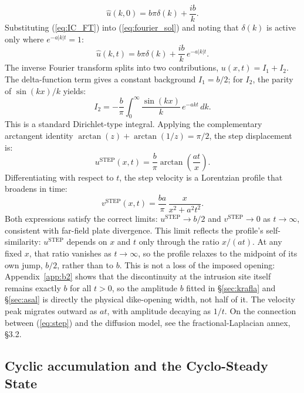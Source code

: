 \documentclass[extra]{gji}
\begin{document}
\begin{equation}
\hat{u}(k,0) = b\pi\delta(k) + \frac{ib}{k}.
\label{eq:IC_FT}
\end{equation}
Substituting (\ref{eq:IC_FT}) into (\ref{eq:fourier_sol}) and noting that
$\delta(k)$ is active only where $e^{-a|k|t}=1$:
\begin{equation}
\hat{u}(k,t) = b\pi\delta(k) + \frac{ib}{k}\,e^{-a|k|t}.
\label{eq:evolved}
\end{equation}
The inverse Fourier transform splits into two contributions,
$u(x,t) = I_1 + I_2$. The delta-function term gives a constant background
$I_1 = b/2$; for $I_2$, the parity of $\sin(kx)/k$ yields:
\begin{equation}
I_2 = -\frac{b}{\pi}\int_0^{\infty}\frac{\sin(kx)}{k}\,e^{-akt}\,dk.
\label{eq:I2}
\end{equation}
This is a standard Dirichlet-type integral. Applying the complementary
arctangent identity $\arctan(z)+\arctan(1/z)=\pi/2$, the step displacement is:
\begin{equation}
\boxed{u^{\text{STEP}}(x,t) = \frac{b}{\pi}\arctan\!\left(\frac{at}{x}\right).}
\label{eq:step}
\end{equation}
Differentiating with respect to $t$, the step velocity is a Lorentzian
profile that broadens in time:
\begin{equation}
v^{\text{STEP}}(x,t) = \frac{b a}{\pi}\,\frac{x}{x^2 + a^2t^2}.
\label{eq:stepv}
\end{equation}
Both expressions satisfy the correct limits: $u^{\text{STEP}}\to b/2$ and
$v^{\text{STEP}}\to 0$ as $t\to\infty$, consistent with far-field plate
divergence. This limit reflects the profile's self-similarity:
$u^{\text{STEP}}$ depends on $x$ and $t$ only through the ratio $x/(at)$. At
any fixed $x$, that ratio vanishes as $t\to\infty$, so the profile relaxes to
the midpoint of its own jump, $b/2$, rather than to $b$. This is not a loss
of the imposed opening: Appendix~\ref{app:b2} shows that the discontinuity
at the intrusion site itself remains exactly $b$ for all $t>0$, so the
amplitude $b$ fitted in \S\ref{sec:krafla} and \S\ref{sec:asal} is directly
the physical dike-opening width, not half of it. The velocity peak
migrates outward as $at$, with amplitude decaying as $1/t$. On the connection between (\ref{eq:step}) and the
\citet{foulger1992post} diffusion model, see the fractional-Laplacian annex,
\S 3.2.

\subsection{Cyclic accumulation and the Cyclo-Steady State}
\label{sec:css}
\end{document}
